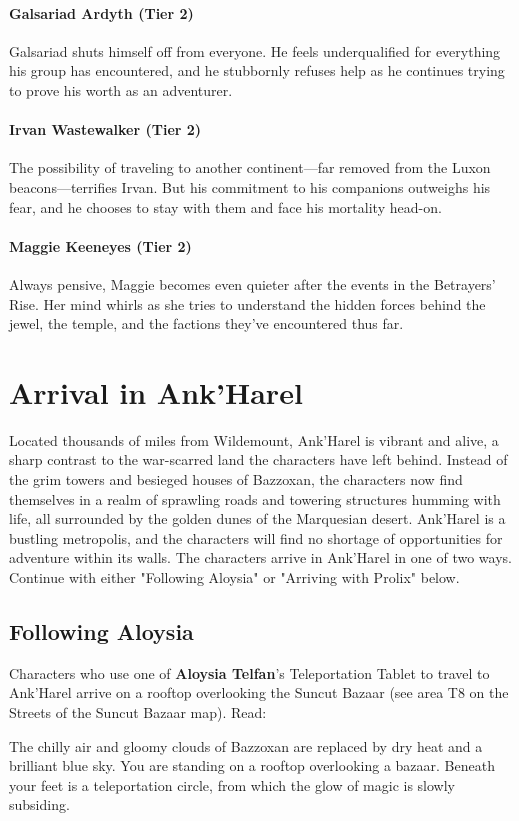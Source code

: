 \documentclass[10pt,a4,twoside,twocolumn,openany,nodeprecatedcode]{dndbook}
\begin{document}
\paragraph{Galsariad Ardyth (Tier 2)}
Galsariad shuts himself off from everyone. He feels underqualified for everything his group has encountered, and he stubbornly refuses help as he continues trying to prove his worth as an adventurer.
\paragraph{Irvan Wastewalker (Tier 2)}
The possibility of traveling to another continent—far removed from the Luxon beacons—terrifies Irvan. But his commitment to his companions outweighs his fear, and he chooses to stay with them and face his mortality head-on.
\paragraph{Maggie Keeneyes (Tier 2)}
Always pensive, Maggie becomes even quieter after the events in the Betrayers' Rise. Her mind whirls as she tries to understand the hidden forces behind the jewel, the temple, and the factions they've encountered thus far.
\section{Arrival in Ank'Harel}
Located thousands of miles from Wildemount, Ank'Harel is vibrant and alive, a sharp contrast to the war-scarred land the characters have left behind. Instead of the grim towers and besieged houses of Bazzoxan, the characters now find themselves in a realm of sprawling roads and towering structures humming with life, all surrounded by the golden dunes of the Marquesian desert. Ank'Harel is a bustling metropolis, and the characters will find no shortage of opportunities for adventure within its walls.
The characters arrive in Ank'Harel in one of two ways. Continue with either "Following Aloysia" or "Arriving with Prolix" below.
\subsection{Following Aloysia}
Characters who use one of \textbf{Aloysia Telfan}'s Teleportation Tablet to travel to Ank'Harel arrive on a rooftop overlooking the Suncut Bazaar (see area T8 on the Streets of the Suncut Bazaar map). Read:
\begin{DndReadAloud}{}
The chilly air and gloomy clouds of Bazzoxan are replaced by dry heat and a brilliant blue sky. You are standing on a rooftop overlooking a bazaar. Beneath your feet is a teleportation circle, from which the glow of magic is slowly subsiding.
\end{DndReadAloud}
\end{document}
